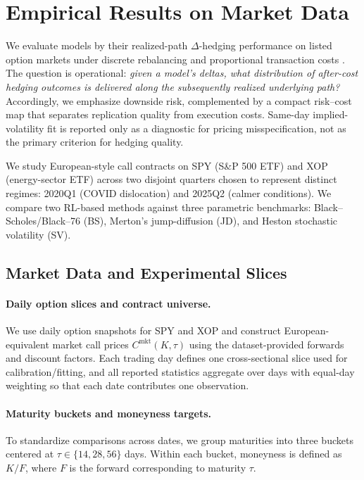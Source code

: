 \section{Empirical Results on Market Data}
\label{sec:empirical_market}

We evaluate models by their realized-path $\Delta$-hedging performance on listed option markets under discrete rebalancing and proportional transaction costs \cite{leland1985option}.
The question is operational: \emph{given a model’s deltas, what distribution of after-cost hedging outcomes is delivered along the subsequently realized underlying path?}
Accordingly, we emphasize downside risk, complemented by a compact risk--cost map that separates replication quality from execution costs.
Same-day implied-volatility fit is reported only as a diagnostic for pricing misspecification, not as the primary criterion for hedging quality.

We study European-style call contracts on SPY (S\&P 500 ETF) and XOP (energy-sector ETF) across two disjoint quarters chosen to represent distinct regimes:
2020Q1 (COVID dislocation) and 2025Q2 (calmer conditions).
We compare two RL-based methods against three parametric benchmarks:
Black--Scholes/Black--76 \cite{black1973pricing,black1976commodity} (BS), Merton’s jump-diffusion \cite{merton1976discontinuous} (JD), and Heston stochastic volatility \cite{heston1993closed} (SV).


\subsection{Market Data and Experimental Slices}
\label{subsec:market_slices}

\paragraph{Daily option slices and contract universe.}
We use daily option snapshots for SPY and XOP and construct European-equivalent market call prices $C^{\mathrm{mkt}}(K,\tau)$ using the dataset-provided forwards and discount factors.
Each trading day defines one cross-sectional slice used for calibration/fitting, and all reported statistics aggregate over days with equal-day weighting so that
each date contributes one observation.

\paragraph{Maturity buckets and moneyness targets.}
To standardize comparisons across dates, we group maturities into three buckets centered at $\tau\in\{14,28,56\}$ days.
Within each bucket, moneyness is defined as $K/F$, where $F$ is the forward corresponding to maturity $\tau$.

